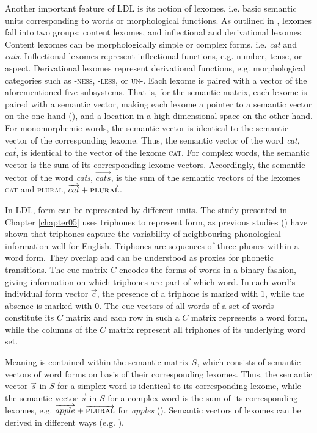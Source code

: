 Another important feature of LDL is its notion of lexomes, i.e. basic semantic units corresponding to words or morphological functions. As outlined in \cite{Chuang2021}, lexomes fall into two groups: content lexomes, and inflectional and derivational lexomes. Content lexomes can be morphologically simple or complex forms, i.e. \textit{cat} and \textit{cats}. Inflectional lexomes represent inflectional functions, e.g. number, tense, or aspect. Derivational lexomes represent derivational functions, e.g. morphological categories such as -\textsc{ness}, -\textsc{less}, or \textsc{un}-. Each lexome is paired with a vector of the aforementioned five subsystems. That is, for the semantic matrix, each lexome is paired with a semantic vector, making each lexome a pointer to a semantic vector on the one hand (\cite{Milin2017Feldman}), and a location in a high-dimensional space on the other hand. For monomorphemic words, the semantic vector is identical to the semantic vector of the corresponding lexome. Thus, the semantic vector of the word \textit{cat}, $\overrightarrow{cat}$, is identical to the vector of the lexome \textsc{cat}. For complex words, the semantic vector is the sum of its corresponding lexome vectors. Accordingly, the semantic vector of the word \textit{cats}, $\overrightarrow{cats}$, is the sum of the semantic vectors of the lexomes \textsc{cat} and \textsc{plural}, $\overrightarrow{cat} +\overrightarrow{\textsc{plural}}$. 

In LDL, form can be represented by different units. The study presented in Chapter \ref{chapter05} uses triphones to represent form, as previous studies (\cite{Milin2017Feldman, Baayen2019, Chuang2020}) have shown that triphones capture the variability of neighbouring phonological information well for English. Triphones are sequences of three phones within a word form. They overlap and can be understood as proxies for phonetic transitions. The cue matrix $C$ encodes the forms of words in a binary fashion, giving information on which triphones are part of which word. In each word’s individual form vector $\overrightarrow{c}$, the presence of a triphone is marked with $1$, while the absence is marked with $0$. The cue vectors of all words of a set of words constitute its $C$ matrix and each row in such a $C$ matrix represents a word form, while the columns of the $C$ matrix represent all triphones of its underlying word set.

Meaning is contained within the semantic matrix $S$, which consists of semantic vectors of word forms on basis of their corresponding lexomes. Thus, the semantic vector $\overrightarrow{s}$ in $S$ for a simplex word is identical to its corresponding lexome, while the semantic vector $\overrightarrow{s}$ in $S$ for a complex word is the sum of its corresponding lexomes, e.g. $\overrightarrow{apple}+\overrightarrow{\textsc{plural}}$ for \textit{apples} (\cite{Baayen2019}). Semantic vectors of lexomes can be derived in different ways (e.g. \cite{Landauer1997, Jones2007, Shaoul2010, Mikolov2013}).

